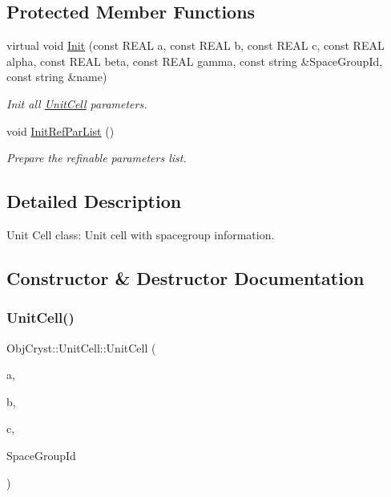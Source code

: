 \subsection*{Protected Member Functions}
\begin{DoxyCompactItemize}
\item 
virtual void \mbox{\hyperlink{class_obj_cryst_1_1_unit_cell_a5c2dd7255f5abe4292c3fd123bf8d005}{Init}} (const R\+E\+AL a, const R\+E\+AL b, const R\+E\+AL c, const R\+E\+AL alpha, const R\+E\+AL beta, const R\+E\+AL gamma, const string \&Space\+Group\+Id, const string \&name)
\begin{DoxyCompactList}\small\item\em Init all \mbox{\hyperlink{class_obj_cryst_1_1_unit_cell}{Unit\+Cell}} parameters. \end{DoxyCompactList}\item 
void \mbox{\hyperlink{class_obj_cryst_1_1_unit_cell_a50170ade8b76500a86b99cd6caa06808}{Init\+Ref\+Par\+List}} ()
\begin{DoxyCompactList}\small\item\em Prepare the refinable parameters list. \end{DoxyCompactList}\end{DoxyCompactItemize}


\subsection{Detailed Description}
Unit Cell class\+: Unit cell with spacegroup information. 



\subsection{Constructor \& Destructor Documentation}
\mbox{\label{class_obj_cryst_1_1_unit_cell_ade3fec2bf55893d193be14001bd74f72}} 
\subsubsection{\texorpdfstring{UnitCell()}{UnitCell()}\hspace{0.1cm}{\footnotesize\ttfamily [1/2]}}
{\footnotesize\ttfamily Obj\+Cryst\+::\+Unit\+Cell\+::\+Unit\+Cell (\begin{DoxyParamCaption}\item[{const R\+E\+AL}]{a,  }\item[{const R\+E\+AL}]{b,  }\item[{const R\+E\+AL}]{c,  }\item[{const string \&}]{Space\+Group\+Id }\end{DoxyParamCaption})}




